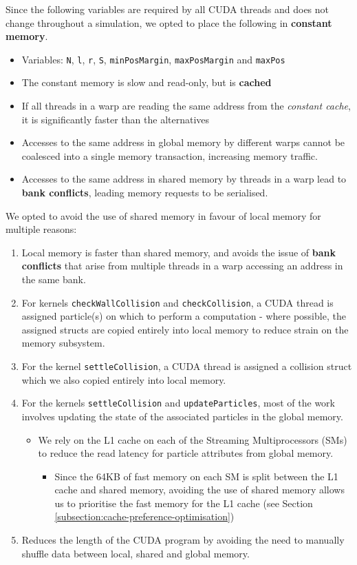 \documentclass[12pt]{article}
\begin{document}
Since the following variables are required by all CUDA threads and does not change throughout a simulation, we opted to place the following in \textbf{constant memory}.
\begin{itemize}
    \item Variables: \texttt{N}, \texttt{l}, \texttt{r}, \texttt{S}, \texttt{minPosMargin}, \texttt{maxPosMargin} and \texttt{maxPos}
    \item The constant memory is slow and read-only, but is \textbf{cached}
    \item If all threads in a warp are reading the same address from the \textit{constant cache}, it is significantly faster than the alternatives
        \item Accesses to the same address in global memory by different warps cannot be coalesced into a single memory transaction, increasing memory traffic.
        \item Accesses to the same address in shared memory by threads in a warp lead to \textbf{bank conflicts}, leading memory requests to be serialised.
\end{itemize}

We opted to avoid the use of shared memory in favour of local memory for multiple reasons:
\begin{enumerate}
    \item Local memory is faster than shared memory, and avoids the issue of \textbf{bank conflicts} that arise from multiple threads in a warp accessing an address in the same bank.
    \item For kernels \texttt{checkWallCollision} and \texttt{checkCollision}, a CUDA thread is assigned particle(s) on which to perform a computation - where possible, the assigned structs are copied entirely into local memory to reduce strain on the memory subsystem.
    \item For the kernel \texttt{settleCollision}, a CUDA thread is assigned a collision struct which we also copied entirely into local memory.
    \item For the kernels \texttt{settleCollision} and \texttt{updateParticles}, most of the work involves updating the state of the associated particles in the global memory.
    \begin{itemize}
        \item We rely on the L1 cache on each of the Streaming Multiprocessors (SMs) to reduce the read latency for particle attributes from global memory.
        \begin{itemize}
            \item Since the 64KB of fast memory on each SM is split between the L1 cache and shared memory, avoiding the use of shared memory allows us to prioritise the fast memory for the L1 cache (see Section \ref{subsection:cache-preference-optimisation})
        \end{itemize}
    \end{itemize}
    \item Reduces the length of the CUDA program by avoiding the need to manually shuffle data between local, shared and global memory.
\end{enumerate}
\end{document}
